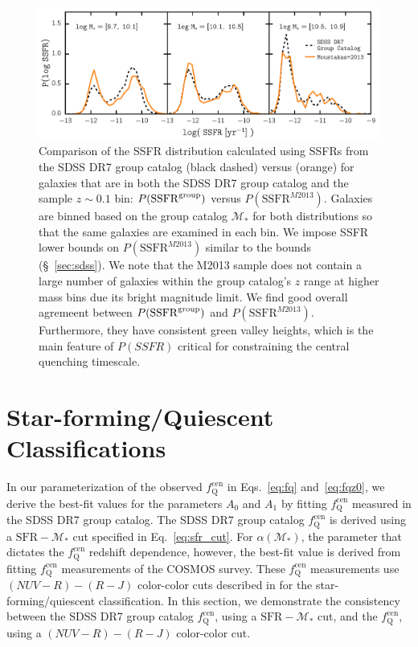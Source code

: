 \documentclass[iop,apj,tighten,twocolappendix,numberedappendix]{emulateapj}
\newcommand{\fqcen}{f_\mathrm{Q}^\mathrm{cen}}
\begin{document}
\begin{figure}
\begin{center}
\includegraphics[scale=0.5]{figs/Pssfr_comparison.pdf}
\caption{
Comparison of the SSFR distribution calculated using 
SSFRs from the SDSS DR7 group catalog (black dashed) versus
\cite{Moustakas:2013aa} (orange) for galaxies that are in 
both the SDSS DR7 group catalog and the \cite{Moustakas:2013aa} 
sample $z\sim0.1$ bin: $P(\mathrm{SSFR}^{\rm group})$ versus 
$P(\mathrm{SSFR}^{M2013})$. Galaxies are binned based on the
group catalog $\mathcal{M}_*$ for both distributions so that 
the same galaxies are examined in each bin. We impose SSFR 
lower bounds on $P(\mathrm{SSFR}^{M2013})$ similar to the 
\cite{Brinchmann:2004aa} bounds (\S~\ref{sec:sdss}). We note 
that the M2013 sample does not contain a large number of galaxies 
within the group catalog's $z$ range at higher mass bins due 
its bright magnitude limit.
We find good overall agremeent between $P(\mathrm{SSFR}^{\rm group})$ 
and $P(\mathrm{SSFR}^{M2013})$. Furthermore, they have consistent 
green valley heights, which is the main feature of $P(SSFR)$ critical 
for constraining the central quenching timescale.
}
\label{fig:Pssfr_comp}
\end{center}
\end{figure}

\section{Star-forming/Quiescent Classifications} \label{app:sfq}
In our parameterization of the observed $\fqcen$ in Eqs.~\ref{eq:fq} and~\ref{eq:fqz0}, 
we derive the best-fit values for the parameters $A_0$ and $A_1$ by fitting 
$\fqcen$ measured in the SDSS DR7 group catalog. The SDSS DR7 group catalog 
$\fqcen$ is derived using a $\mathrm{SFR} - \mathcal{M}_*$ cut 
specified in Eq.~\ref{eq:sfr_cut}. For $\alpha(\mathcal{M}_*)$, the 
parameter that dictates the $\fqcen$ redshift dependence, however, 
the best-fit value is derived from fitting \cite{Tinker:2013aa} 
$\fqcen$ measurements of the COSMOS survey. These $\fqcen$ measurements 
use $(NUV - R) - (R - J)$ color-color cuts described in 
\cite{Bundy:2010aa} for the star-forming/quiescent classification. 
In this section, we demonstrate the consistency between the SDSS 
DR7 group catalog $\fqcen$, using a $\mathrm{SFR} - \mathcal{M}_*$ 
cut, and the \cite{Tinker:2013aa} $\fqcen$, using a $(NUV - R) - (R - J)$ 
color-color cut.
\end{document}
